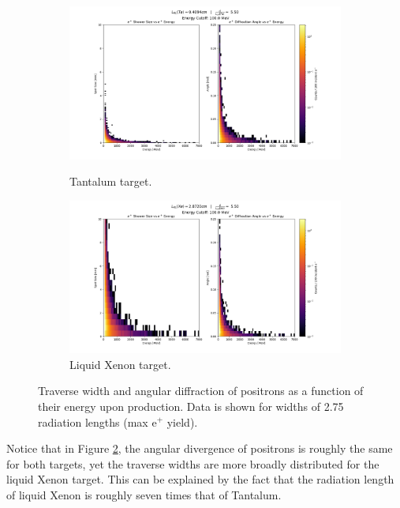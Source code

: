 \documentclass[%
reprint,
amsmath, amssymb,
aps,
floatfix,
]{revtex4-2}
\begin{document}
\begin{figure}[H]
    \begin{subfigure}{.5\textwidth}
        \includegraphics[height = .6\linewidth]{../images/TaHists.png}
        \caption{\label{fig:TaHists}Tantalum target.}
        \includegraphics[height = .6\linewidth]{../images/XeHists.png}
        \caption{\label{fig:XeHists}Liquid Xenon target.}
    \end{subfigure}
    \caption{\label{fig:Hists}Traverse width and angular diffraction of positrons as a function
    of their energy upon production.  Data is shown for widths of 2.75 radiation lengths (max e$^+$ yield).}
\end{figure}

Notice that in Figure \ref{fig:Hists}, the angular divergence of positrons is roughly the same for both targets,
yet the traverse widths are more broadly distributed for the liquid Xenon target.  This can be explained by the 
fact that the radiation length of liquid Xenon is roughly seven times that of Tantalum.
\end{document}
